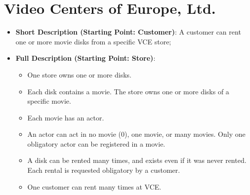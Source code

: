 \chapter{Video Centers of Europe, Ltd.}

\begin{itemize}
	\item{\textbf{Short Description (Starting Point: Customer)}: A customer can rent one or more movie disks from a specific VCE store;}
	\item{\textbf{Full Description (Starting Point: Store)}: \begin{itemize}
		\item{One store owns one or more disks.}
		\item{Each disk contains a movie. The store owns one or more disks of a specific movie.}
		\item{Each movie has an actor.}
		\item{An actor can act in no movie (0), one movie, or many movies. Only one obligatory actor can be registered in a movie.}
		\item{A disk can be rented many times, and exists even if it was never rented. Each rental is requested obligatory by a customer.}
		\item{One customer can rent many times at VCE.}
	\end{itemize}}
\end{itemize}